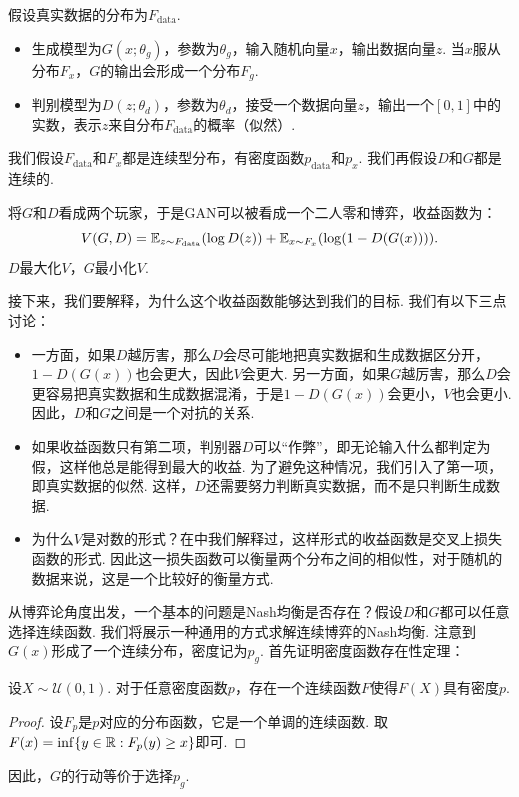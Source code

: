假设真实数据的分布为$F_{\text{data}}$. 
\begin{itemize}
    \item 生成模型为$G(x;\theta_g)$，参数为$\theta_g$，输入随机向量$x$，输出数据向量$z$. 当$x$服从分布$F_x$，$G$的输出会形成一个分布$F_g$. 
    \item 判别模型为$D(z;\theta_d)$，参数为$\theta_d$，接受一个数据向量$z$，输出一个$[0,1]$中的实数，表示$z$来自分布$F_{\text{data}}$的概率（似然）.
\end{itemize}
我们假设$F_{\text{data}}$和$F_x$都是连续型分布，有密度函数$p_{\text{data}}$和$p_x$. 我们再假设$D$和$G$都是连续的.

将$G$和$D$看成两个玩家，于是GAN可以被看成一个二人零和博弈，收益函数为：
    \[
        V(G,D)=\mathbb{E}_{z\sim F_{\text{data}}}(\log D(z))+\mathbb{E}_{x\sim F_x}(\log(1-D(G(x)))).
    \]
$D$最大化$V$，$G$最小化$V$.

接下来，我们要解释，为什么这个收益函数能够达到我们的目标. 我们有以下三点讨论：

\begin{itemize}
    \item 一方面，如果$D$越厉害，那么$D$会尽可能地把真实数据和生成数据区分开，$1-D(G(x))$也会更大，因此$V$会更大. 另一方面，如果$G$越厉害，那么$D$会更容易把真实数据和生成数据混淆，于是$1-D(G(x))$会更小，$V$也会更小. 因此，$D$和$G$之间是一个对抗的关系.
    
    \item 如果收益函数只有第二项，判别器$D$可以“作弊”，即无论输入什么都判定为假，这样他总是能得到最大的收益. 为了避免这种情况，我们引入了第一项，即真实数据的似然. 这样，$D$还需要努力判断真实数据，而不是只判断生成数据.
    
    \item 为什么$V$是对数的形式？在中我们解释过，这样形式的收益函数是交叉上损失函数的形式. 因此这一损失函数可以衡量两个分布之间的相似性，对于随机的数据来说，这是一个比较好的衡量方式.
\end{itemize}


从博弈论角度出发，一个基本的问题是Nash均衡是否存在？假设$D$和$G$都可以任意选择连续函数. 我们将展示一种通用的方式求解连续博弈的Nash均衡. 注意到$G(x)$形成了一个连续分布，密度记为$p_g$.  首先证明密度函数存在性定理：
\begin{theorem}
设$X\sim \mathcal U(0,1)$. 对于任意密度函数$p$，存在一个连续函数$F$使得$F(X)$具有密度$p$.
\end{theorem}
\begin{proof}
设$F_p$是$p$对应的分布函数，它是一个单调的连续函数. 取$F(x)=\inf\{y\in \mathbb{R}: F_p(y)\geq x\}$即可.
\end{proof}
因此，$G$的行动等价于选择$p_g$.

